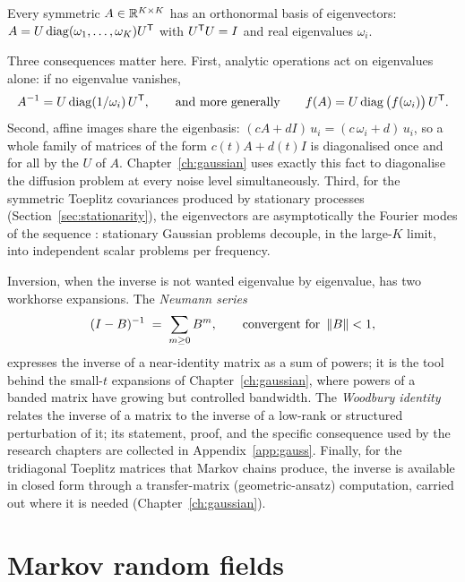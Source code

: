 \begin{theorem}
\label{thm:spectral}
Every symmetric $A \in \mathbb{R}^{K \times K}$ has an orthonormal basis of
eigenvectors: $A = U \operatorname{diag}(\omega_1, \dots, \omega_K)
U^{\mathsf{T}}$ with $U^{\mathsf{T}} U = I$ and real eigenvalues $\omega_i$.
\end{theorem}

Three consequences matter here. First, analytic operations act on
eigenvalues alone: if no eigenvalue vanishes,
\begin{equation*}
  A^{-1} = U \operatorname{diag}(1/\omega_i)\, U^{\mathsf{T}},
  \qquad\text{and more generally}\qquad
  f(A) = U \operatorname{diag}\big(f(\omega_i)\big)\, U^{\mathsf{T}} .
\end{equation*} Second, affine images
share the eigenbasis: $(cA + dI)\, u_i = (c\,\omega_i + d)\, u_i$, so a
whole family of matrices of the form $c(t) A + d(t) I$ is diagonalised
once and for all by the $U$ of $A$. Chapter~\ref{ch:gaussian} uses
exactly this fact to diagonalise the diffusion problem at every noise
level simultaneously. Third, for the symmetric
Toeplitz covariances produced by stationary processes
(Section~\ref{sec:stationarity}), the eigenvectors are asymptotically the
Fourier modes of the sequence \citep{brockwell1991time}: stationary
Gaussian problems decouple, in the large-$K$ limit, into independent
scalar problems per frequency.

Inversion, when the inverse is not wanted eigenvalue by eigenvalue, has
two workhorse expansions. The \emph{Neumann series}
\begin{equation}
  (I - B)^{-1} \;=\; \sum_{m \geq 0} B^m ,
  \qquad \text{convergent for } \left\lVert B \right\rVert < 1 ,
  \label{eq:neumann}
\end{equation}
expresses the inverse of a near-identity matrix as a sum of powers; it is
the tool behind the small-$t$ expansions of Chapter~\ref{ch:gaussian},
where powers of a banded matrix have growing but controlled bandwidth.
The \emph{Woodbury identity} relates the inverse of a matrix to the
inverse of a low-rank or structured perturbation of it; its statement,
proof, and the specific consequence used by the research chapters are
collected in Appendix~\ref{app:gauss}. Finally, for the tridiagonal
Toeplitz matrices that Markov chains produce, the inverse is available in
closed form through a transfer-matrix (geometric-ansatz) computation,
carried out where it is needed
(Chapter~\ref{ch:gaussian}).

\section{Markov random fields}\label{sec:mrf}

